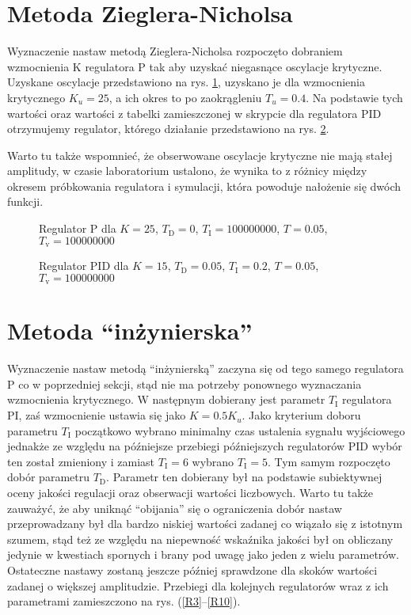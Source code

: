 \section{Metoda Zieglera-Nicholsa}
Wyznaczenie nastaw metodą Zieglera-Nicholsa rozpoczęto dobraniem wzmocnienia K regulatora P tak aby uzyskać niegasnące oscylacje krytyczne. Uzyskane oscylacje przedstawiono na rys. \ref{R1}, uzyskano je dla wzmocnienia krytycznego $K_u = 25$, a ich okres to po zaokrągleniu $T_u = 0.4$. Na podstawie tych wartości oraz wartości z tabelki zamieszczonej w skrypcie dla regulatora PID otrzymujemy regulator, którego działanie przedstawiono na rys. \ref{R2}.

Warto tu także wspomnieć, że obserwowane oscylacje krytyczne nie mają stałej amplitudy, w czasie laboratorium ustalono, że wynika to z różnicy między okresem próbkowania regulatora i symulacji, która powoduje nałożenie się dwóch funkcji.

\begin{figure}[H]
\centering

\caption{Regulator P dla $K = 25$, $T_\mathrm{D} = 0$, $T_\mathrm{I} = 100000000$, $T = 0.05$, $T_\mathrm{v} = 100000000$}
\label{R1}
\end{figure}

\begin{figure}[H]
\centering

\caption{Regulator PID dla $K = 15$, $T_\mathrm{D} = 0.05$, $T_\mathrm{I} = 0.2$, $T = 0.05$, $T_\mathrm{v} = 100000000$}
\label{R2}
\end{figure}

\section{Metoda ``inżynierska''}
Wyznaczenie nastaw metodą ``inżynierską'' zaczyna się od tego samego regulatora P co w poprzedniej sekcji, stąd nie ma potrzeby ponownego wyznaczania wzmocnienia krytycznego. W następnym dobierany jest parametr $T_\mathrm{I}$ regulatora PI, zaś wzmocnienie ustawia się jako $K = \num{0.5}K_u$. Jako kryterium doboru parametru $T_\mathrm{I}$ początkowo wybrano minimalny czas ustalenia sygnału wyjściowego jednakże ze względu na późniejsze przebiegi późniejszych regulatorów PID wybór ten został zmieniony i zamiast $T_\mathrm{I} = 6$ wybrano $T_\mathrm{I} = 5$. Tym samym rozpoczęto dobór parametru $T_\mathrm{D}$. Parametr ten dobierany był na podstawie subiektywnej oceny jakości regulacji oraz obserwacji wartości liczbowych. Warto tu także zauważyć, że aby uniknąć ``obijania'' się o ograniczenia dobór nastaw przeprowadzany był dla bardzo niskiej wartości zadanej co wiązało się z istotnym szumem, stąd też ze względu na niepewność wskaźnika jakości był on obliczany jedynie w kwestiach spornych i brany pod uwagę jako jeden z wielu parametrów. Ostateczne nastawy zostaną jeszcze później sprawdzone dla skoków wartości zadanej o większej amplitudzie. Przebiegi dla kolejnych regulatorów wraz z ich parametrami zamieszczono na rys. (\ref{R3}--\ref{R10}).

